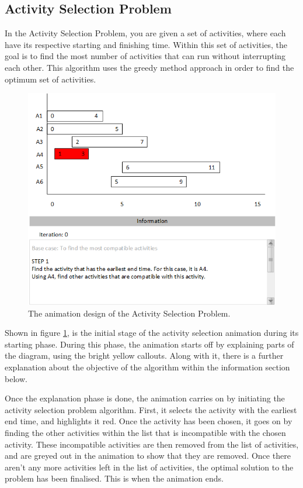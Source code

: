 \subsection{Activity Selection Problem}

In the Activity Selection Problem, you are given a set of activities, where each have its respective starting and finishing time. Within this set of activities, the goal is to find the most number of activities that can run without interrupting each other. This algorithm uses the greedy method approach in order to find the optimum set of activities. 

\begin{figure}[H]
\centering
\includegraphics[scale=0.9]{images/report_images/animationDesignActivitySelectionProblem_STEP1.png}
\caption{The animation design of the Activity Selection Problem.}
\label{animationDesignActivitySelectionProblem}
\end{figure}

Shown in figure \ref{animationDesignActivitySelectionProblem}, is the initial stage of the activity selection animation during its starting phase. During this phase, the animation starts off by explaining parts of the diagram, using the bright yellow callouts. Along with it, there is a further explanation about the objective of the algorithm within the information section below.

Once the explanation phase is done, the animation carries on by initiating the activity selection problem algorithm. First, it selects the activity with the earliest end time, and highlights it red. Once the activity has been chosen, it goes on by finding the other activities within the list that is incompatible with the chosen activity. These incompatible activities are then removed from the list of activities, and are greyed out in the animation to show that they are removed. Once there aren't any more activities left in the list of activities, the optimal solution to the problem has been finalised. This is when the animation ends. 

